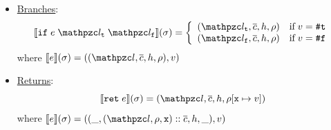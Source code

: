 \begin{itemize}
  \item \underline{Branches}:
    \[
      \sem{\kwif \; \expr \; \lab_\vart \; \lab_\varf}(\st) =
      \left\{
        \begin{array}{ll}
          (\lab_\vart, \ctxts, \heap, \env) & \text{if} \; \val = \true\\
          (\lab_\varf, \ctxts, \heap, \env) & \text{if} \; \val = \false\\
        \end{array}
      \right.
    \]
    where $\sem{\expr}(\st) = ((\lab, \ctxts, \heap, \env), \val)$

  \item \underline{Returns}:
    \[
      \sem{\kwret \; \expr}(\st) = (\lab, \ctxts, \heap, \env[\varx \mapsto
      \val])
    \]
    where $\sem{\expr}(\st) = ((\_, (\lab, \env, \varx) :: \ctxts, \heap, \_),
    \val)$
\end{itemize}


